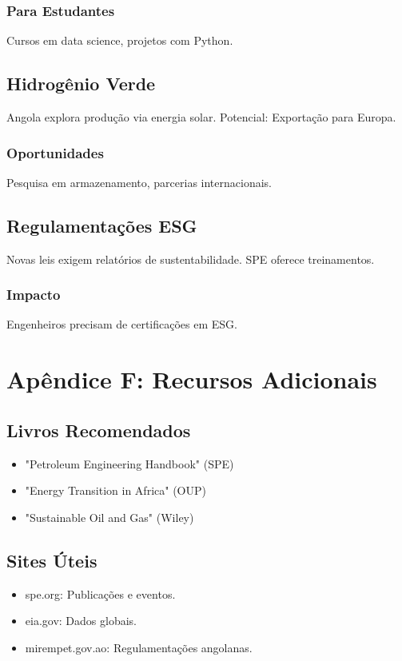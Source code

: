 \documentclass[12pt]{article}
\begin{document}
\subsubsection{Para Estudantes}
Cursos em data science, projetos com Python.

\subsection{Hidrogênio Verde}
Angola explora produção via energia solar. Potencial: Exportação para Europa.

\subsubsection{Oportunidades}
Pesquisa em armazenamento, parcerias internacionais.

\subsection{Regulamentações ESG}
Novas leis exigem relatórios de sustentabilidade. SPE oferece treinamentos.

\subsubsection{Impacto}
Engenheiros precisam de certificações em ESG.

\clearpage
\section{Apêndice F: Recursos Adicionais}

\subsection{Livros Recomendados}
\begin{itemize}
    \item "Petroleum Engineering Handbook" (SPE)
    \item "Energy Transition in Africa" (OUP)
    \item "Sustainable Oil and Gas" (Wiley)
\end{itemize}

\subsection{Sites Úteis}
\begin{itemize}
    \item spe.org: Publicações e eventos.
    \item eia.gov: Dados globais.
    \item mirempet.gov.ao: Regulamentações angolanas.
\end{itemize}
\end{document}
